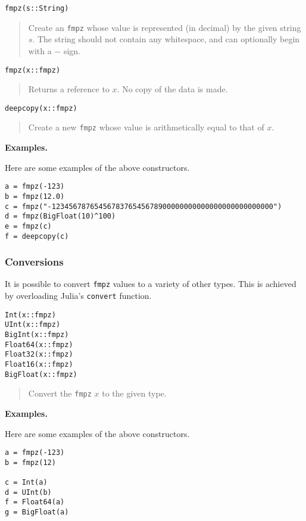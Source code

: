 \documentclass[a4paper,10pt]{article}
\newcommand{\code}{\lstinline}
\newcommand{\desc}[1]{\vspace{-3mm}\begin{quote}#1\end{quote}}
\begin{document}
\begin{lstlisting}
fmpz(s::String)
\end{lstlisting}

\desc{Create an \code{fmpz} whose value is represented (in decimal) by the given string
$s$. The string should not contain any whitespace, and can optionally begin with
a $-$ sign.}

\begin{lstlisting}
fmpz(x::fmpz)
\end{lstlisting}

\desc{Returns a reference to $x$. No copy of the data is made.}

\begin{lstlisting}
deepcopy(x::fmpz)
\end{lstlisting}

\desc{Create a new \code{fmpz} whose value is arithmetically equal to that of $x$.}

\textbf{Examples.}

Here are some examples of the above constructors.

\begin{lstlisting}
a = fmpz(-123)
b = fmpz(12.0)
c = fmpz("-1234567876545678376545678900000000000000000000000000")
d = fmpz(BigFloat(10)^100)
e = fmpz(c)
f = deepcopy(c)
\end{lstlisting}

\subsubsection{Conversions}

It is possible to convert \code{fmpz} values to a variety of other types. This is
achieved by overloading Julia's \code{convert} function.

\begin{lstlisting}
Int(x::fmpz)
UInt(x::fmpz)
BigInt(x::fmpz)
Float64(x::fmpz)
Float32(x::fmpz)
Float16(x::fmpz)
BigFloat(x::fmpz)
\end{lstlisting}

\desc{Convert the \code{fmpz} $x$ to the given type.}

\textbf{Examples.}

Here are some examples of the above constructors.

\begin{lstlisting}
a = fmpz(-123)
b = fmpz(12)

c = Int(a)
d = UInt(b)
f = Float64(a)
g = BigFloat(a)
\end{lstlisting}
\end{document}
